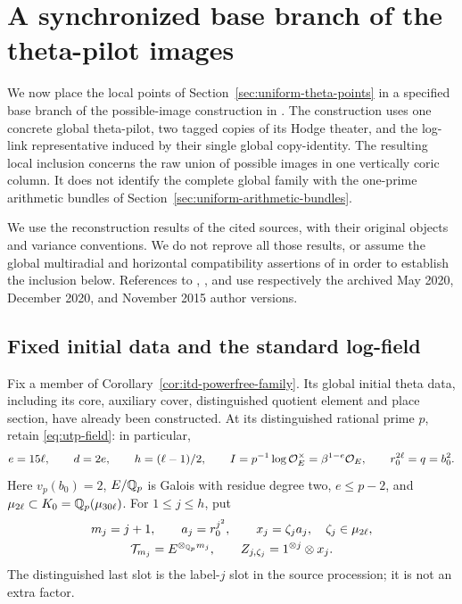 \section{A synchronized base branch of the theta-pilot images}
\label{sec:uniform-identity-membership}

We now place the local points of
Section~\ref{sec:uniform-theta-points} in a specified base branch
of the possible-image construction in
\cite[Corollary~3.12]{IUT3}. The construction uses one concrete
global theta-pilot, two tagged copies of its Hodge theater,
and the log-link representative induced by their single global
copy-identity. The resulting local inclusion concerns the raw
union of possible images in one vertically coric column.
It does not identify the complete global family with the
one-prime arithmetic bundles of
Section~\ref{sec:uniform-arithmetic-bundles}.

We use the reconstruction results of the cited sources, with
their original objects and variance conventions. We do not
reprove all those results, or assume the global multiradial
and horizontal compatibility assertions of
\cite[Theorem~3.11]{IUT3} in order to establish the inclusion
below. References to \cite{IUT1,IUT3}, \cite{IUT2}, and
\cite{MochizukiAbsTopIII2015} use respectively the archived
May 2020, December 2020, and November 2015 author versions.

\subsection{Fixed initial data and the standard log-field}

Fix a member of Corollary~\ref{cor:itd-powerfree-family}.
Its global initial theta data, including its core, auxiliary
cover, distinguished quotient element and place section, have
already been constructed. At its distinguished rational
prime \(p\), retain \eqref{eq:utp-field}: in particular,
\[
 e=15\ell,\qquad d=2e,\qquad h=(\ell-1)/2,\qquad
 I=p^{-1}\log\mathcal O_E^\times=\beta^{1-e}\mathcal O_E,\qquad
 r_0^{2\ell}=q=b_0^2.
\]
Here \(v_p(b_0)=2\), \(E/\mathbb Q_p\) is Galois with residue
degree two, \(e\le p-2\), and
\(\mu_{2\ell}\subset K_0=\mathbb Q_p(\mu_{30\ell})\).
For \(1\le j\le h\), put
\begin{equation}\label{eq:uim-point-data}
 \begin{gathered}
 m_j=j+1,\qquad a_j=r_0^{j^2},\qquad
 x_j=\zeta_j a_j,\quad \zeta_j\in\mu_{2\ell},\\
 \mathcal T_{m_j}=E^{\otimes_{\mathbb Q_p}m_j},\qquad
 Z_{j,\zeta_j}=1^{\otimes j}\otimes x_j .
 \end{gathered}
\end{equation}
The distinguished last slot is the label-\(j\) slot in the
source procession; it is not an extra factor.

